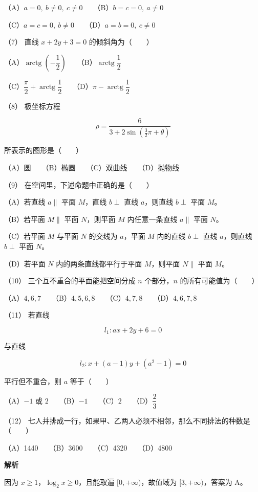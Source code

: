 \begin{answer}
（A）$a=0,\ b\ne0,\ c\ne0$　　（B）$b=c=0,\ a\ne0$

（C）$a=c=0,\ b\ne0$　　（D）$a=b=0,\ c\ne0$

（7） 直线 $x+2y+3=0$ 的倾斜角为\mbox{（　　）}

（A）$\operatorname{arctg}\left(-\dfrac12\right)$　　（B）$\operatorname{arctg}\dfrac12$

（C）$\dfrac\pi2+\operatorname{arctg}\dfrac12$　　（D）$\pi-\operatorname{arctg}\dfrac12$

（8） 极坐标方程

\nopagebreak[4]
\[
\rho=\frac6{3+2\sin\left(\frac32\pi+\theta\right)}
\]

所表示的图形是\mbox{（　　）}

（A）圆　　（B）椭圆　　（C）双曲线　　（D）抛物线

（9） 在空间里，下述命题中正确的是\mbox{（　　）}

（A）若直线 $a\parallel$ 平面 $M$，直线 $b\perp$ 直线 $a$，则直线 $b\perp$ 平面 $M$。

（B）若平面 $M\parallel$ 平面 $N$，则平面 $M$ 内任意一条直线 $a\parallel$ 平面 $N$。

（C）若平面 $M$ 与平面 $N$ 的交线为 $a$，平面 $M$ 内的直线 $b\perp$ 直线 $a$，则直线 $b\perp$ 平面 $N$。

（D）若平面 $N$ 内的两条直线都平行于平面 $M$，则平面 $N\parallel$ 平面 $M$。

（10） 三个互不重合的平面能把空间分成 $n$ 个部分，$n$ 的所有可能值为\mbox{（　　）}

（A）$4,6,7$　　（B）$4,5,6,8$　　（C）$4,7,8$　　（D）$4,6,7,8$

（11） 若直线

\nopagebreak[4]
\[
l_1:ax+2y+6=0
\]

与直线

\nopagebreak[4]
\[
l_2:x+(a-1)y+(a^2-1)=0
\]

平行但不重合，则 $a$ 等于\mbox{（　　）}

（A）$-1$ 或 $2$　　（B）$-1$　　（C）$2$　　（D）$\dfrac23$

（12） 七人并排成一行，如果甲、乙两人必须不相邻，那么不同排法的种数是\mbox{（　　）}

（A）1440　　（B）3600　　（C）4320　　（D）4800

\textbf{解析}


因为 $x\ge1$，$\log_2x\ge0$，且能取遍 $[0,+\infty)$，故值域为 $[3,+\infty)$，答案为 A。


\end{answer}
